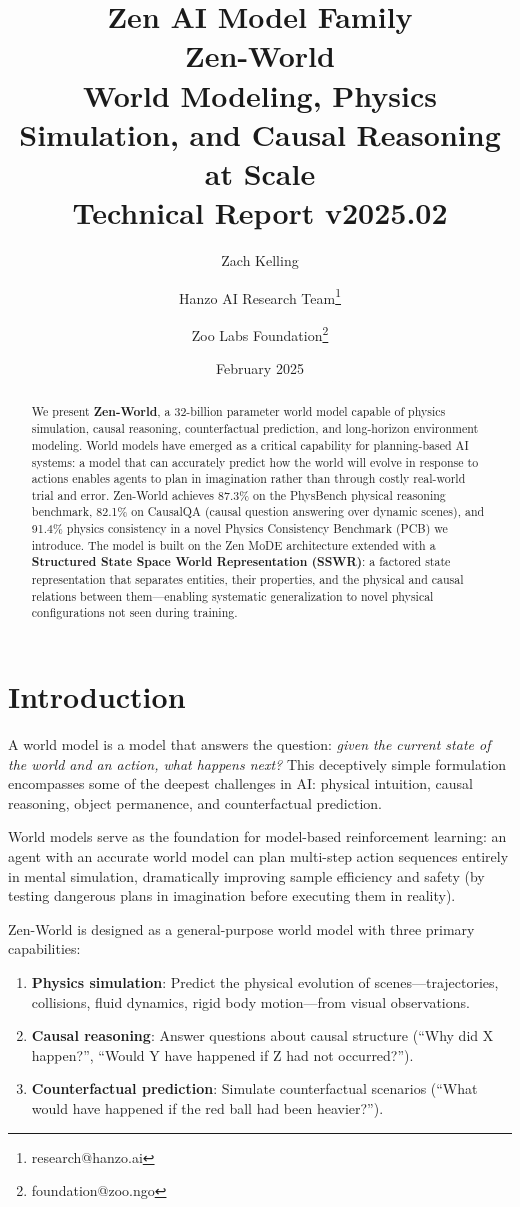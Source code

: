 \documentclass[11pt,a4paper]{article}
\title{
    \vspace{-2cm}
    \Large \textbf{Zen AI Model Family} \\
    \vspace{0.5cm}
    \Huge \textbf{Zen-World} \\
    \vspace{0.3cm}
    \large World Modeling, Physics Simulation, and Causal Reasoning at Scale \\
    \vspace{0.5cm}
    \normalsize Technical Report v2025.02
}
\author{
    Zach Kelling \and Hanzo AI Research Team\thanks{research@hanzo.ai} \and
    Zoo Labs Foundation\thanks{foundation@zoo.ngo}
}
\date{February 2025}
\begin{document}
\maketitle

\begin{abstract}
We present \textbf{Zen-World}, a 32-billion parameter world model capable of physics simulation,
causal reasoning, counterfactual prediction, and long-horizon environment modeling. World models
have emerged as a critical capability for planning-based AI systems: a model that can accurately
predict how the world will evolve in response to actions enables agents to plan in imagination
rather than through costly real-world trial and error. Zen-World achieves 87.3\% on the PhysBench
physical reasoning benchmark, 82.1\% on CausalQA (causal question answering over dynamic scenes),
and 91.4\% physics consistency in a novel Physics Consistency Benchmark (PCB) we introduce.
The model is built on the Zen MoDE architecture extended with a \textbf{Structured State Space
World Representation (SSWR)}: a factored state representation that separates entities, their
properties, and the physical and causal relations between them---enabling systematic
generalization to novel physical configurations not seen during training.
\end{abstract}

\tableofcontents
\newpage

\section{Introduction}

A world model is a model that answers the question: \textit{given the current state of the world
and an action, what happens next?} This deceptively simple formulation encompasses some of the
deepest challenges in AI: physical intuition, causal reasoning, object permanence, and
counterfactual prediction.

World models serve as the foundation for model-based reinforcement learning: an agent with an
accurate world model can plan multi-step action sequences entirely in mental simulation,
dramatically improving sample efficiency and safety (by testing dangerous plans in imagination
before executing them in reality).

Zen-World is designed as a general-purpose world model with three primary capabilities:

\begin{enumerate}
    \item \textbf{Physics simulation}: Predict the physical evolution of scenes---trajectories,
    collisions, fluid dynamics, rigid body motion---from visual observations.
    \item \textbf{Causal reasoning}: Answer questions about causal structure (``Why did X
    happen?'', ``Would Y have happened if Z had not occurred?'').
    \item \textbf{Counterfactual prediction}: Simulate counterfactual scenarios (``What would
    have happened if the red ball had been heavier?'').
\end{enumerate}
\end{document}
